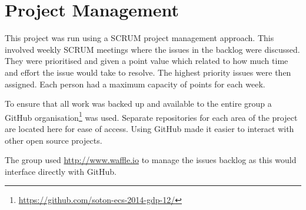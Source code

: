 \chapter{Project Management} \label{Chapter: Project Management}
This project was run using a SCRUM project management approach. This involved weekly SCRUM meetings where the issues in the backlog were discussed. They were prioritised and given a point value which related to how much time and effort the issue would take to resolve. The highest priority issues were then assigned. Each person had a maximum capacity of points for each week. 

To ensure that all work was backed up and available to the entire group a GitHub organisation\footnote{\url{https://github.com/soton-ecs-2014-gdp-12/}} was used. Separate repositories for each area of the project are located here for ease of access. Using GitHub made it easier to interact with other open source projects.

The group used \url{http://www.waffle.io} to manage the issues backlog as this would interface directly with GitHub.